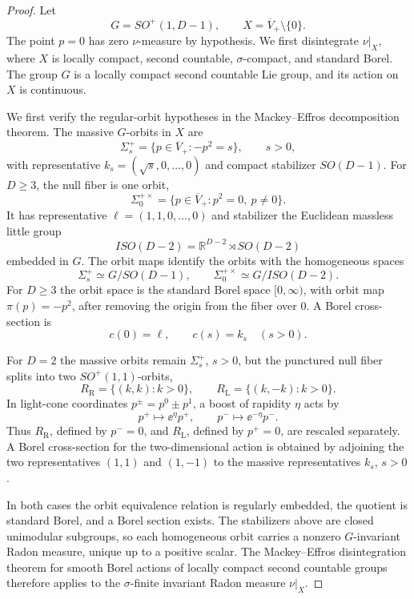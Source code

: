 \begin{proof}
Let
\[
  G=SO^+(1,D-1),\qquad X=\overline V_+\setminus\{0\}.
\]
The point \(p=0\) has zero \(\nu\)-measure by hypothesis.  We first disintegrate
\(\nu|_X\), where \(X\) is locally compact, second countable,
\(\sigma\)-compact, and standard Borel.  The group \(G\) is a locally compact
second countable Lie group, and its action on \(X\) is continuous.

We first verify the regular-orbit hypotheses in the Mackey--Effros
decomposition theorem.  The massive \(G\)-orbits in \(X\) are
\[
  \Sigma_s^+
  =
  \{p\in\overline V_+: -p^2=s\},
  \qquad s>0,
\]
with representative \(k_s=(\sqrt s,0,\ldots,0)\) and compact stabilizer
\(SO(D-1)\).  For \(D\ge3\), the null fiber is one orbit,
\[
  \Sigma_0^{+\times}
  =
  \{p\in\overline V_+:p^2=0,\ p\ne0\}.
\]
It has representative \(\ell=(1,1,0,\ldots,0)\) and stabilizer the Euclidean
massless little group
\[
  ISO(D-2)=\mathbb R^{D-2}\rtimes SO(D-2)
\]
embedded in \(G\).  The orbit maps identify the orbits with the homogeneous
spaces
\[
  \Sigma_s^+\simeq G/SO(D-1),
  \qquad
  \Sigma_0^{+\times}\simeq G/ISO(D-2).
\]
For \(D\ge3\) the orbit space is the standard Borel space \([0,\infty)\), with
orbit map \(\pi(p)=-p^2\), after removing the origin from the fiber over
\(0\).  A Borel cross-section is
\[
  c(0)=\ell,\qquad c(s)=k_s\quad(s>0).
\]

For \(D=2\) the massive orbits remain \(\Sigma_s^+\), \(s>0\), but the
punctured null fiber splits into two \(SO^+(1,1)\)-orbits,
\[
  R_{\mathrm R}=\{(k,k):k>0\},
  \qquad
  R_{\mathrm L}=\{(k,-k):k>0\}.
\]
In light-cone coordinates \(p^\pm=p^0\pm p^1\), a boost of rapidity \(\eta\)
acts by
\[
  p^+\mapsto \ee^\eta p^+,\qquad
  p^-\mapsto \ee^{-\eta}p^- .
\]
Thus \(R_{\mathrm R}\), defined by \(p^-=0\), and \(R_{\mathrm L}\), defined by
\(p^+=0\), are rescaled separately.  A Borel cross-section for the
two-dimensional action is obtained by adjoining the two representatives
\((1,1)\) and \((1,-1)\) to the massive representatives \(k_s\), \(s>0\).

In both cases the orbit equivalence relation is regularly embedded, the
quotient is standard Borel, and a Borel section exists.  The stabilizers above
are closed unimodular subgroups, so each homogeneous orbit carries a nonzero
\(G\)-invariant Radon measure, unique up to a positive scalar.  The
Mackey--Effros disintegration theorem for smooth Borel actions of locally
compact second countable groups therefore applies to the \(\sigma\)-finite
invariant Radon measure \(\nu|_X\).


\end{proof}
